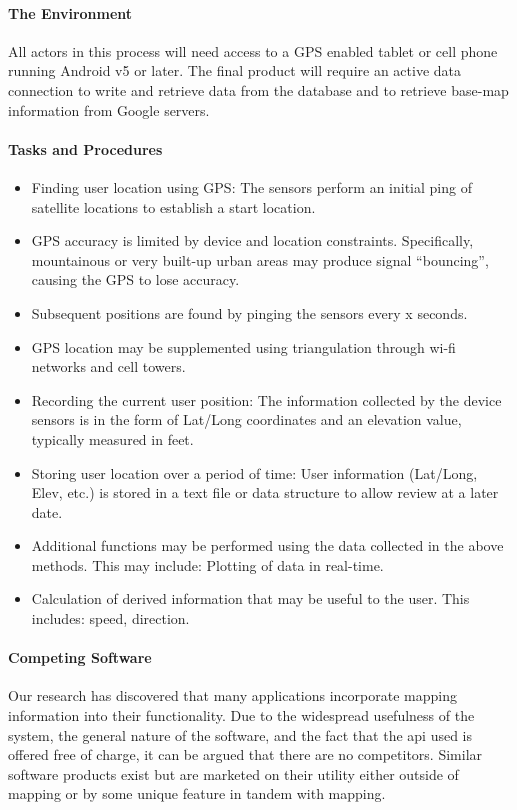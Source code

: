 \documentclass{article}
\begin{document}
\paragraph{The Environment}
All actors in this process will need access to a GPS enabled tablet or cell phone running Android v5 or later.  The final product will require an active data connection to write and retrieve data from the database and to retrieve base-map information from Google servers.

\paragraph{Tasks and Procedures}
\begin{itemize}
\item Finding user location using GPS: The sensors perform an initial ping of satellite locations to establish a start location.
\item GPS accuracy is limited by device and location constraints. Specifically, mountainous or very built-up urban areas may produce signal “bouncing”, causing the GPS to lose accuracy.
\item Subsequent positions are found by pinging the sensors every x seconds.
\item GPS location may be supplemented using triangulation through wi-fi networks and cell towers.
\item Recording the current user position: The information collected by the device sensors is in the form of Lat/Long coordinates and an elevation value, typically measured in feet.
\item Storing user location over a period of time: User information (Lat/Long, Elev, etc.) is stored in a text file or data structure to allow review at a later date.
\item Additional functions may be performed using the data collected in the above methods. This may include: Plotting of data in real-time.
\item Calculation of derived information that may be useful to the user. This includes: speed, direction.
\end{itemize}

\paragraph{Competing Software}
Our research has discovered that many applications incorporate mapping information into their functionality. Due to the widespread usefulness of the system, the general nature of the software, and the fact that the api used is offered free of charge, it can be argued that there are no competitors. Similar software products exist but are marketed on their utility either outside of mapping or by some unique feature in tandem with mapping.
\end{document}
